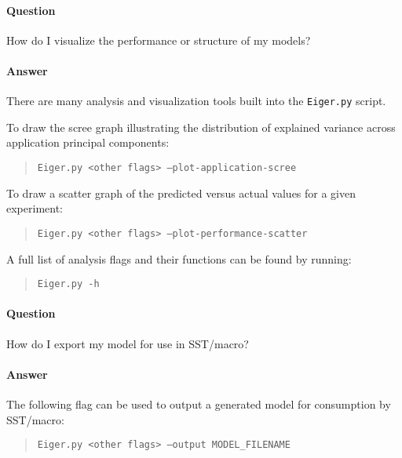 \paragraph{Question}
How do I visualize the performance or structure of my models?
\paragraph{Answer}
There are many analysis and visualization tools built into the
\texttt{Eiger.py} script.

To draw the scree graph illustrating the distribution of explained variance
across application principal components:

	\begin{quote}
	\texttt{Eiger.py <other flags> --plot-application-scree}
	\end{quote}

To draw a scatter graph of the predicted versus actual values for a given
experiment:

	\begin{quote}
	\texttt{Eiger.py <other flags> --plot-performance-scatter}
	\end{quote}

A full list of analysis flags and their functions can be found by running:

	\begin{quote}
	\texttt{Eiger.py -h}
	\end{quote}

\paragraph{Question}
How do I export my model for use in SST/macro?
\paragraph{Answer}
The following flag can be used to output a generated model for
consumption by SST/macro:

	\begin{quote}
	\texttt{Eiger.py <other flags> --output MODEL\_FILENAME}
	\end{quote}

